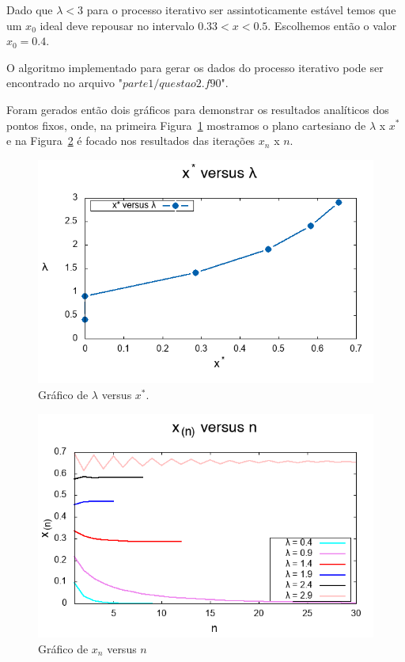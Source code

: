 \documentclass[12pt]{article}
\begin{document}
Dado que $\lambda < 3$ para o processo iterativo ser assintoticamente estável temos que um $x_{0}$ ideal deve repousar no intervalo $0.33 < x < 0.5$. Escolhemos então o valor $x_{0} = 0.4$.

O algoritmo implementado para gerar os dados do processo iterativo pode ser encontrado no arquivo "$\textit{parte1/questao2.f90}$".

Foram gerados então dois gráficos para demonstrar os resultados analíticos dos pontos fixos, onde, na primeira Figura~\ref{fig:p1q2g1} mostramos o plano cartesiano de $\lambda$ x $x^{*}$ e na Figura~\ref{fig:p1q2g2} é focado nos resultados das iterações $x_{n}$ x $n$.

\begin{figure}[H]
	\centering
	\includegraphics[width=1\textwidth]{p1q2g1.png}
	\caption{Gráfico de $\lambda$ versus $x^{*}$.}
	\label{fig:p1q2g1}
\end{figure}

\begin{figure}[H]
	\centering
	\includegraphics[width=1\textwidth]{p1q2g2.png}
	\caption{Gráfico de $x_{n}$ versus $n$}
	\label{fig:p1q2g2}
\end{figure}
\end{document}
